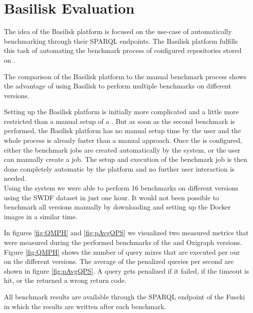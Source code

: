 \section{Basilisk Evaluation}
The idea of the Basilisk platform is focused on the use-case of automatically benchmarking \tsp{} through their SPARQL endpoints.
The Basilisk platform fulfills this task of automating the benchmark process of configured \ts{} repositories stored on \dockh{}.

The comparison of the Basilisk platform to the manual benchmark process shows the advantage of using Basilisk to perform multiple benchmarks on different \ts{} versions.

Setting up the Basilisk platform is initially more complicated and a little more restricted than a manual setup of a \ts{}.
But as soon as the second benchmark is performed, the Basilisk platform has no manual setup time by the user and the whole process is already faster than a manual approach.
Once the \ts{} is configured, either the benchmark jobs are created automatically by the system, or the user can manually create a job.
The setup and execution of the benchmark job is then done completely automatic by the platform and no further user interaction is needed.
\\

Using the system we were able to perform 16 benchmarks on different \tentris{} versions using the SWDF dataset in just one hour.
It would not been possible to benchmark all versions manually by downloading and setting up the Docker images in a similar time.

In figures \ref{fig:QMPH} and \ref{fig:pAvgQPS} we visualized two measured metrics that were measured during the performed benchmarks of the \tentris{} and Oxigraph versions.
Figure \ref{fig:QMPH} shows the number of query mixes that are executed per our on the different \ts{} versions.
The average of the penalized queries per second are shown in figure \ref{fig:pAvgQPS}.
A query gets penalized if it failed, \eg{} if the timeout is hit, or the \ts{} returned a wrong return code.

All benchmark results are available through the SPARQL endpoint of the Fuseki \ts{} in which the results are written after each benchmark.


